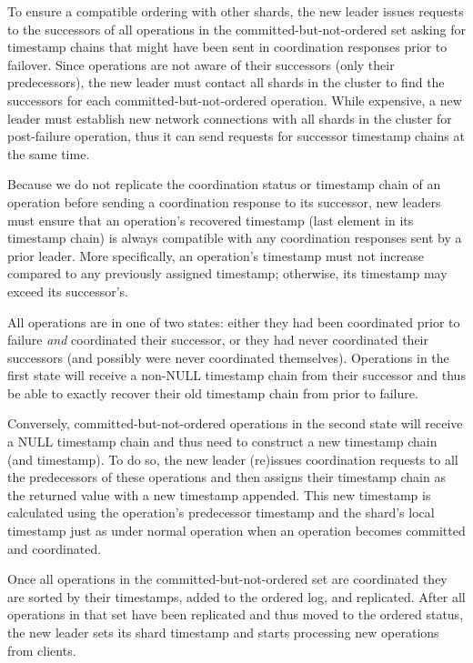 To ensure a compatible ordering with other shards, the new leader issues requests to the successors of all operations in the committed-but-not-ordered set asking for timestamp chains that might have been sent in coordination responses prior to failover. Since operations are not aware of their successors (only their predecessors), the new leader must contact all shards in the cluster to find the successors for each committed-but-not-ordered operation. While expensive, a new leader must establish new network connections with all shards in the cluster for post-failure operation, thus it can send requests for successor timestamp chains at the same time.

Because we do not replicate the coordination status or timestamp chain of an operation before sending a coordination response to its successor, new leaders must ensure that an operation's recovered timestamp (last element in its    timestamp chain) is always compatible with any coordination responses sent by a prior leader. More specifically, an operation's timestamp must not increase compared to any previously assigned timestamp; otherwise, its timestamp may exceed its successor's.

All operations are in one of two states: either they had been coordinated prior to failure \textit{and} coordinated their successor, or they had never coordinated their successors (and possibly were never coordinated themselves). Operations in the first state will receive a non-NULL timestamp chain from their successor and thus be able to exactly recover their old timestamp chain from prior to failure. 

Conversely, committed-but-not-ordered operations in the second state will receive a NULL timestamp chain and thus need to construct a new timestamp chain (and timestamp). To do so, the new leader (re)issues coordination requests to all the predecessors of these operations and then assigns their timestamp chain as the returned value with a new timestamp appended. This new timestamp is calculated using the operation's predecessor timestamp and the shard's local timestamp just as under normal operation when an operation becomes committed and coordinated.

Once all operations in the committed-but-not-ordered set are coordinated they are sorted by their timestamps, added to the ordered log, and replicated.
After all operations in that set have been replicated and thus moved to the ordered status, the new leader sets its shard timestamp and starts processing new operations from clients.

